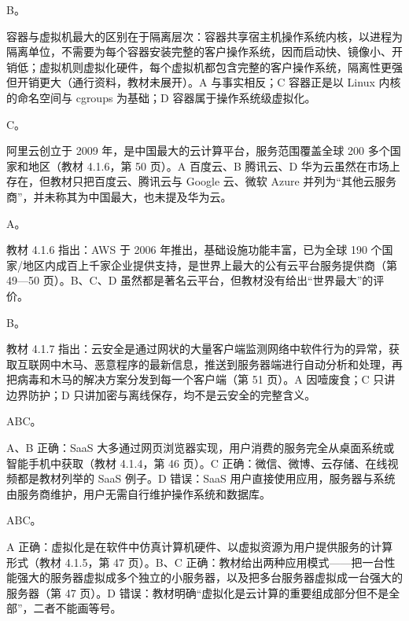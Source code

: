 \documentclass[a4paper,11pt]{article}
\begin{document}
\q B。\begin{analysis}容器与虚拟机最大的区别在于隔离层次：容器共享宿主机操作系统内核，以进程为隔离单位，不需要为每个容器安装完整的客户操作系统，因而启动快、镜像小、开销低；虚拟机则虚拟化硬件，每个虚拟机都包含完整的客户操作系统，隔离性更强但开销更大（通行资料，教材未展开）。A 与事实相反；C 容器正是以 Linux 内核的命名空间与 cgroups 为基础；D 容器属于操作系统级虚拟化。\end{analysis}

\q C。\begin{analysis}阿里云创立于 2009 年，是中国最大的云计算平台，服务范围覆盖全球 200 多个国家和地区（教材 4.1.6，第 50 页）。A 百度云、B 腾讯云、D 华为云虽然在市场上存在，但教材只把百度云、腾讯云与 Google 云、微软 Azure 并列为“其他云服务商”，并未称其为中国最大，也未提及华为云。\end{analysis}

\q A。\begin{analysis}教材 4.1.6 指出：AWS 于 2006 年推出，基础设施功能丰富，已为全球 190 个国家/地区内成百上千家企业提供支持，是世界上最大的公有云平台服务提供商（第 49—50 页）。B、C、D 虽然都是著名云平台，但教材没有给出“世界最大”的评价。\end{analysis}

\q B。\begin{analysis}教材 4.1.7 指出：云安全是通过网状的大量客户端监测网络中软件行为的异常，获取互联网中木马、恶意程序的最新信息，推送到服务器端进行自动分析和处理，再把病毒和木马的解决方案分发到每一个客户端（第 51 页）。A 因噎废食；C 只讲边界防护；D 只讲加密与离线保存，均不是云安全的完整含义。\end{analysis}


\q ABC。\begin{analysis}A、B 正确：SaaS 大多通过网页浏览器实现，用户消费的服务完全从桌面系统或智能手机中获取（教材 4.1.4，第 46 页）。C 正确：微信、微博、云存储、在线视频都是教材列举的 SaaS 例子。D 错误：SaaS 用户直接使用应用，服务器与系统由服务商维护，用户无需自行维护操作系统和数据库。\end{analysis}

\q ABC。\begin{analysis}A 正确：虚拟化是在软件中仿真计算机硬件、以虚拟资源为用户提供服务的计算形式（教材 4.1.5，第 47 页）。B、C 正确：教材给出两种应用模式——把一台性能强大的服务器虚拟成多个独立的小服务器，以及把多台服务器虚拟成一台强大的服务器（第 47 页）。D 错误：教材明确“虚拟化是云计算的重要组成部分但不是全部”，二者不能画等号。\end{analysis}
\end{document}
